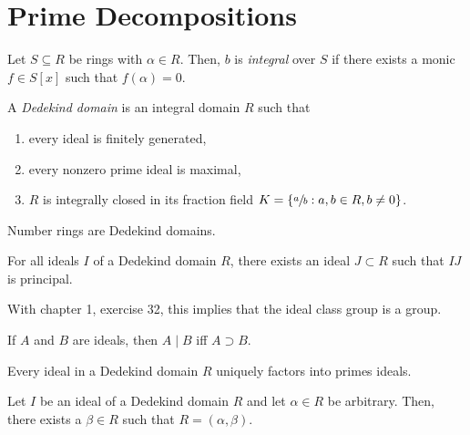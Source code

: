 \section{Prime Decompositions}

\begin{definition}[Integral]
	Let $S \subseteq R$ be rings with $\alpha \in R$. Then, $b$ is \textit{integral} over $S$ if there exists a monic $f \in S[x]$ such that $f(\alpha) = 0$.
\end{definition}

\begin{definition}
	A \textit{Dedekind domain} is an integral domain $R$ such that
	\begin{enumerate}
		\item every ideal is finitely generated,
		\item every nonzero prime ideal is maximal,
		\item $R$ is integrally closed in its fraction field $K = \{ \sfrac a b : a, b \in R, b \neq 0 \}$.
	\end{enumerate}
\end{definition}


\begin{theorem}
	Number rings are Dedekind domains.
\end{theorem}

\begin{theorem}
	For all ideals $I$ of a Dedekind domain $R$, there exists an ideal $J \subset R$ such that $IJ$ is principal.
\end{theorem}

\begin{corrolary}
	With chapter 1, exercise 32, this implies that the ideal class group is a group.
\end{corrolary}

\begin{corrolary}
	If $A$ and $B$ are ideals, then $A \mid B$ iff $A \supset B$.
\end{corrolary}

\begin{theorem}
	Every ideal in a Dedekind domain $R$ uniquely factors into primes ideals.
\end{theorem}

\begin{theorem}
	Let $I$ be an ideal of a Dedekind domain $R$ and let $\alpha \in R$ be arbitrary. Then, there exists a $\beta \in R$ such that $R = (\alpha, \beta)$.
\end{theorem}

